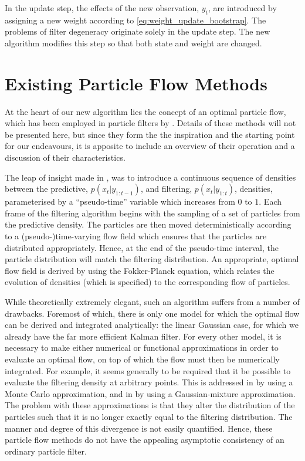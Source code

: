 \documentclass[a4paper,10pt]{article}
\begin{document}
In the update step, the effects of the new observation, $y_t$, are introduced by assigning a new weight according to \eqref{eq:weight_update_bootstrap}. The problems of filter degeneracy originate solely in the update step. The new algorithm modifies this step so that both state and weight are changed.



\section{Existing Particle Flow Methods}

At the heart of our new algorithm lies the concept of an optimal particle flow, which has been employed in particle filters by \cite{Daum2008,Daum2011d,Reich2011}. Details of these methods will not be presented here, but since they form the the inspiration and the starting point for our endeavours, it is apposite to include an overview of their operation and a discussion of their characteristics.

The leap of insight made in \cite{Daum2008}, was to introduce a continuous sequence of densities between the predictive, $p(x_t|y_{1:t-1})$, and filtering, $p(x_t|y_{1:t})$, densities, parameterised by a ``pseudo-time'' variable which increases from $0$ to $1$. Each frame of the filtering algorithm begins with the sampling of a set of particles from the predictive density. The particles are then moved deterministically according to a (pseudo-)time-varying flow field which ensures that the particles are distributed appropriately. Hence, at the end of the pseudo-time interval, the particle distribution will match the filtering distribution. An appropriate, optimal flow field is derived by using the Fokker-Planck equation, which relates the evolution of densities (which is specified) to the corresponding flow of particles.

While theoretically extremely elegant, such an algorithm suffers from a number of drawbacks. Foremost of which, there is only one model for which the optimal flow can be derived and integrated analytically: the linear Gaussian case, for which we already have the far more efficient Kalman filter. For every other model, it is necessary to make either numerical or functional approximations in order to evaluate an optimal flow, on top of which the flow must then be numerically integrated. For example, it seems generally to be required that it be possible to evaluate the filtering density at arbitrary points. This is addressed in \cite{Daum2012} by using a Monte Carlo approximation, and in \cite{Reich2012a} by using a Gaussian-mixture approximation. The problem with these approximations is that they alter the distribution of the particles such that it is no longer exactly equal to the filtering distribution. The manner and degree of this divergence is not easily quantified. Hence, these particle flow methods do not have the appealing asymptotic consistency of an ordinary particle filter.
\end{document}
